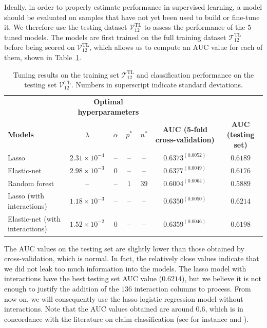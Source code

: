 \documentclass{article}
\begin{document}
Ideally, in order to properly estimate performance in supervised learning, a model should be evaluated on samples that have not yet been used to build or fine-tune it. We therefore use the testing dataset $\mathcal{V}_{12}^\text{TL}$ to assess the performance of the $5$ tuned models. The models are first trained on the full training dataset $\mathcal{T}_{12}^\text{TL}$ before being scored on $\mathcal{V}_{12}^\text{TL}$, which allows us to compute an AUC value for each of them, shown in Table~\ref{tab:results_classification}.
\begin{table}[ht]
    \centering
    \begin{adjustbox}{width = \textwidth}
        \begin{tabular}{l c c c c c c}
            \toprule 
            & \multicolumn{4}{c}{\textbf{Optimal hyperparameters}} & &\\
            \cmidrule(l){2-5}
            \textbf{Models} & $\lambda$ & $\alpha$ & $p^*$ & $n^*$ & \textbf{AUC (5-fold cross-validation)} & \textbf{AUC (testing set)}\\
            \midrule
            Lasso & $2.31 \times 10^{-4}$ & -- & -- & -- & $0.6373^{(0.0052)}$ & $0.6189$\\
            Elastic-net & $2.98 \times 10^{-3}$ & $0$ & -- & -- & $0.6377^{(0.0049)}$ & $0.6176$\\
            Random forest & -- & -- & $1$ & $39$ & $0.6004^{(0.0064)}$ & $0.5889$\\
            Lasso (with interactions) & $1.18 \times 10^{-3}$ & -- & -- & -- & $0.6350^{(0.0050)}$ & $0.6214$\\
            Elastic-net (with interactions) & $1.52 \times 10^{-2}$ & $0$ & -- & -- & $0.6359^{(0.0046)}$ & $0.6198$\\
            \bottomrule 
        \end{tabular}
    \end{adjustbox}
    \caption{Tuning results on the training set $\mathcal{T}_{12}^\text{TL}$ and classification performance on the testing set $\mathcal{V}_{12}^\text{TL}$. Numbers in superscript indicate standard deviations.} 
    \label{tab:results_classification} 
\end{table}
The AUC values on the testing set are slightly lower than those obtained by cross-validation, which is normal. In fact, the relatively close values indicate that we did not leak too much information into the models. The lasso model with interactions have the best testing set AUC value ($0.6214$), but we believe it is not enough to justify the addition of the $136$ interaction columns to process. From now on, we will consequently use the lasso logistic regression model without interactions. Note that the AUC values obtained are around $0.6$, which is in concordance with the literature on claim classification (see for instance \cite{huang2019automobile} and \cite{baecke2017value}).
\end{document}
